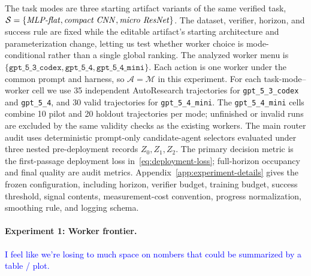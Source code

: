 \documentclass{article}
\newcommand{\cA}{\mathcal{A}}
\newcommand{\cM}{\mathcal{M}}
\newcommand{\cS}{\mathcal{S}}
\begin{document}



The task modes are three starting artifact variants of the same verified task, \(\cS=\{\text{\textit{MLP-flat}},\text{\textit{compact CNN}},\text{\textit{micro ResNet}}\}\).
The dataset, verifier, horizon, and success rule are fixed while the editable artifact's starting architecture and parameterization change, letting us test whether worker choice is mode-conditional rather than a single global ranking.
The analyzed worker menu is \(\{\texttt{gpt\_5\_3\_codex},\texttt{gpt\_5\_4},\texttt{gpt\_5\_4\_mini}\}\).
Each action is one worker under the common prompt and harness, so \(\cA=\cM\) in this experiment.
For each task-mode--worker cell we use 35 independent AutoResearch trajectories for \texttt{gpt\_5\_3\_codex} and \texttt{gpt\_5\_4}, and 30 valid trajectories for \texttt{gpt\_5\_4\_mini}.
The \texttt{gpt\_5\_4\_mini} cells combine 10 pilot and 20 holdout trajectories per mode; unfinished or invalid runs are excluded by the same validity checks as the existing workers.
The main router audit uses deterministic prompt-only candidate-agent selectors evaluated under three nested pre-deployment records \(Z_0,Z_1,Z_2\).
The primary decision metric is the first-passage deployment loss in~\eqref{eq:deployment-loss}; full-horizon occupancy and final quality are audit metrics.
Appendix~\ref{app:experiment-details} gives the frozen configuration, including horizon, verifier budget, training budget, success threshold, signal contents, measurement-cost convention, progress normalization, smoothing rule, and logging schema.

\paragraph{Experiment 1: Worker frontier.}

\textcolor{blue}{I feel like we're losing to much space on nombers that could be summarized by a table / plot. }
\end{document}
